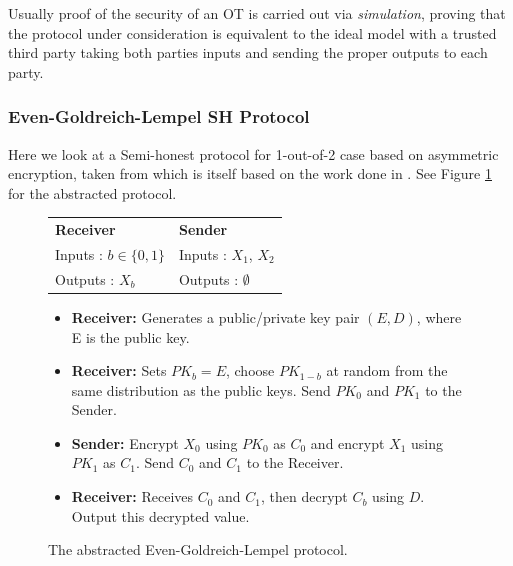 \documentclass[a4paper,11pt]{article}
\begin{document}
				Usually proof of the security of an OT is carried out via \emph{simulation}, proving that the protocol under consideration is equivalent to the ideal model with a trusted third party taking both parties inputs and sending the proper outputs to each party.

			\subsubsection{Even-Goldreich-Lempel SH Protocol}
				Here we look at a Semi-honest protocol for 1-out-of-2 case based on asymmetric encryption, taken from \cite{PinkasSlides2014} which is itself based on the work done in \cite{EvenEtAl85}. See Figure \ref{fig:EvenGoldreichLempel} for the abstracted protocol.

				\begin{figure}[!htb]
					\begin{tabular}[!htb]{p{6cm} p{6cm}}
						\textbf{Receiver} & \textbf{Sender}\\
						Inputs : $b \in \{0, 1\}$ & Inputs : $X_1$, $X_2$\\
						Outputs : $X_b$ & Outputs : $\emptyset$\\
					\end{tabular}

					\begin{itemize}
						\setlength{\itemsep}{0.5pt}
						\setlength{\parskip}{0pt}
						\setlength{\parsep}{0pt}

						\item \textbf{Receiver:} Generates a public/private key pair $(E, D)$, where E is the public key.\\
						\item \textbf{Receiver:} Sets $PK_b = E$, choose $PK_{1-b}$ at random from the same distribution as the public keys. Send $PK_0$ and $PK_1$ to the Sender.\\
						\item \textbf{Sender:} Encrypt $X_0$ using $PK_0$ as $C_0$ and encrypt $X_1$ using $PK_1$ as $C_1$. Send $C_0$ and $C_1$ to the Receiver.\\
						\item \textbf{Receiver:} Receives $C_0$ and $C_1$, then decrypt $C_b$ using $D$. Output this decrypted value.
					\end{itemize}

					\caption{The abstracted Even-Goldreich-Lempel protocol. \label{fig:EvenGoldreichLempel}}
				\end{figure}
\end{document}
